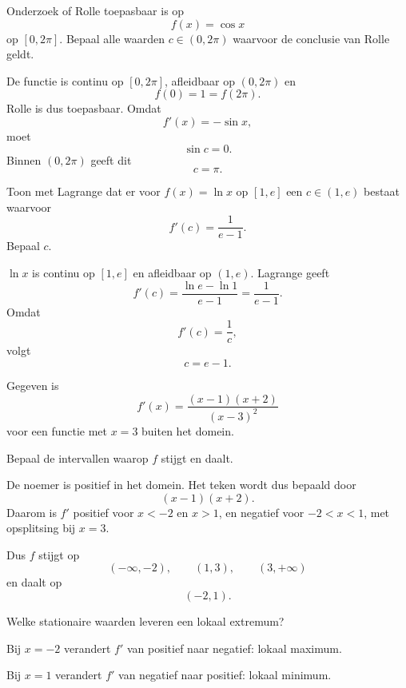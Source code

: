 \documentclass{ximera}
\begin{document}


\begin{oefening}{\oefB\ESS}
\begin{question}
Onderzoek of Rolle toepasbaar is op
\[f(x)=\cos x\]
op \([0,2\pi]\). Bepaal alle waarden \(c\in(0,2\pi)\) waarvoor de
conclusie van Rolle geldt.

\begin{oplossing}
De functie is continu op \([0,2\pi]\), afleidbaar op \((0,2\pi)\) en
\[
f(0)=1=f(2\pi).
\]
Rolle is dus toepasbaar. Omdat
\[
f'(x)=-\sin x,
\]
moet
\[
\sin c=0.
\]
Binnen \((0,2\pi)\) geeft dit
\[
\boxed{c=\pi}.
\]
\end{oplossing}
\end{question}

\begin{question}
Toon met Lagrange dat er voor \(f(x)=\ln x\) op \([1,e]\) een
\(c\in(1,e)\) bestaat waarvoor
\[
f'(c)=\frac1{e-1}.
\]
Bepaal \(c\).

\begin{oplossing}
\(\ln x\) is continu op \([1,e]\) en afleidbaar op \((1,e)\).
Lagrange geeft
\[
f'(c)=\frac{\ln e-\ln1}{e-1}=\frac1{e-1}.
\]
Omdat
\[
f'(c)=\frac1c,
\]
volgt
\[
\boxed{c=e-1}.
\]
\end{oplossing}
\end{question}
\end{oefening}

\begin{oefening}{\oefB\ESS}
Gegeven is
\[
f'(x)=\frac{(x-1)(x+2)}{(x-3)^2}
\]
voor een functie met \(x=3\) buiten het domein.

\begin{question}
Bepaal de intervallen waarop \(f\) stijgt en daalt.

\begin{oplossing}
De noemer is positief in het domein. Het teken wordt dus bepaald door
\[
(x-1)(x+2).
\]
Daarom is \(f'\) positief voor \(x<-2\) en \(x>1\), en negatief voor
\(-2<x<1\), met opsplitsing bij \(x=3\).

Dus \(f\) stijgt op
\[
(-\infty,-2),\qquad(1,3),\qquad(3,+\infty)
\]
en daalt op
\[
(-2,1).
\]
\end{oplossing}
\end{question}

\begin{question}
Welke stationaire waarden leveren een lokaal extremum?

\begin{oplossing}
Bij \(x=-2\) verandert \(f'\) van positief naar negatief: lokaal maximum.

Bij \(x=1\) verandert \(f'\) van negatief naar positief: lokaal minimum.
\end{oplossing}
\end{question}
\end{oefening}
\end{document}
